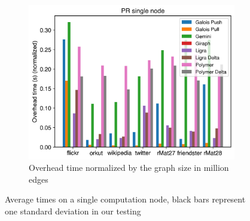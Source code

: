 \begin{figure}
\begin{subfigure}{0.3\textwidth}
		\includegraphics[width=\linewidth]{../../plots/singleNodePR_overheadTimeNormalized.png}
		\caption{Overhead time normalized by the graph size in million edges}
		\label{fig:singleNodePR_overheadNormalized}
	\end{subfigure}
	
	\caption{Average times on a single computation node, black bars represent one standard deviation in our testing}
\end{figure}




